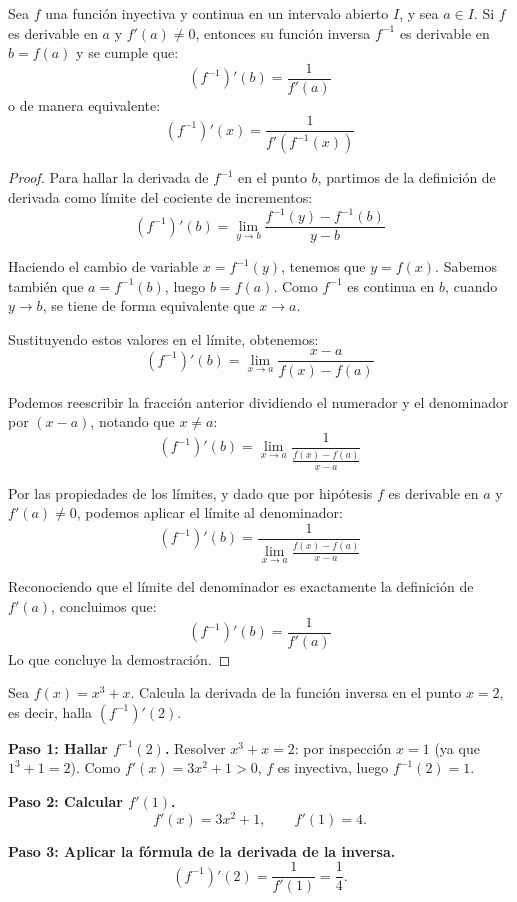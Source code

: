 \begin{theorem}
Sea $f$ una función inyectiva y continua en un intervalo abierto $I$, y sea $a \in I$. Si $f$ es derivable en $a$ y $f'(a) \neq 0$, entonces su función inversa $f^{-1}$ es derivable en $b = f(a)$ y se cumple que:
\[
(f^{-1})'(b) = \frac{1}{f'(a)}
\]
o de manera equivalente:
\[
(f^{-1})'(x) = \frac{1}{f'(f^{-1}(x))}
\]
\end{theorem}

\begin{proof}
Para hallar la derivada de $f^{-1}$ en el punto $b$, partimos de la definición de derivada como límite del cociente de incrementos:
\[
(f^{-1})'(b) = \lim_{y \to b} \frac{f^{-1}(y) - f^{-1}(b)}{y - b}
\]

Haciendo el cambio de variable $x = f^{-1}(y)$, tenemos que $y = f(x)$. Sabemos también que $a = f^{-1}(b)$, luego $b = f(a)$. Como $f^{-1}$ es continua en $b$, cuando $y \to b$, se tiene de forma equivalente que $x \to a$.

Sustituyendo estos valores en el límite, obtenemos:
\[
(f^{-1})'(b) = \lim_{x \to a} \frac{x - a}{f(x) - f(a)}
\]

Podemos reescribir la fracción anterior dividiendo el numerador y el denominador por $(x - a)$, notando que $x \neq a$:
\[
(f^{-1})'(b) = \lim_{x \to a} \frac{1}{\frac{f(x) - f(a)}{x - a}}
\]

Por las propiedades de los límites, y dado que por hipótesis $f$ es derivable en $a$ y $f'(a) \neq 0$, podemos aplicar el límite al denominador:
\[
(f^{-1})'(b) = \frac{1}{\lim_{x \to a} \frac{f(x) - f(a)}{x - a}}
\]

Reconociendo que el límite del denominador es exactamente la definición de $f'(a)$, concluimos que:
\[
(f^{-1})'(b) = \frac{1}{f'(a)}
\]
Lo que concluye la demostración.
\end{proof}

\begin{example}[Derivada de la función inversa: $f(x)=x^3+x$]
Sea $f(x) = x^3 + x$. Calcula la derivada de la función inversa en el punto $x = 2$, es decir, halla $(f^{-1})'(2)$.

\begin{myproof}

\textbf{Paso 1: Hallar $f^{-1}(2)$.}
Resolver $x^3 + x = 2$: por inspección $x=1$ (ya que $1^3+1=2$). Como $f'(x)=3x^2+1>0$, $f$ es inyectiva, luego $f^{-1}(2)=1$.

\textbf{Paso 2: Calcular $f'(1)$.}
\[
    f'(x) = 3x^2 + 1, \qquad f'(1) = 4.
\]

\textbf{Paso 3: Aplicar la fórmula de la derivada de la inversa.}
\[
    \boxed{(f^{-1})'(2) = \frac{1}{f'(1)} = \frac{1}{4}.}
\]
\end{myproof}
\end{example}

